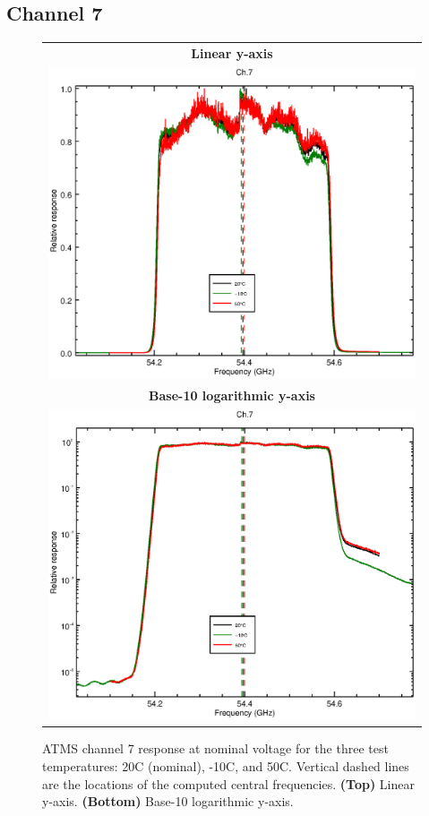 \subsection{Channel 7}
\begin{figure}[H]
  \label{fig:Tset.ch7_response}
  \centering
  \begin{tabular}{c}
    \hspace{1.75cm}\sffamily\textbf{Linear y-axis} \\
    \includegraphics[scale=0.55]{graphics/srf/Tset/lin/atms_npp-7.eps} \\
    \hspace{1.75cm}\sffamily\textbf{Base-10 logarithmic y-axis} \\
    \includegraphics[scale=0.55]{graphics/srf/Tset/log/atms_npp-7.eps}
  \end{tabular}
  \caption{ATMS channel 7 response at nominal voltage for the three test temperatures: 20\textdegree{}C (nominal), -10\textdegree{}C, and 50\textdegree{}C. Vertical dashed lines are the locations of the computed central frequencies. \textbf{(Top)} Linear y-axis. \textbf{(Bottom)} Base-10 logarithmic y-axis.}
\end{figure}

